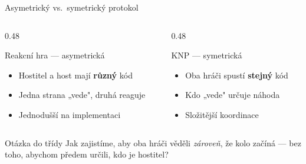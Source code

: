 \begin{frame}{Asymetrický vs.\ symetrický protokol}

  \begin{columns}[T]
    \begin{column}{0.48\textwidth}
      \begin{block}{Reakcní hra — asymetrická}
        \begin{itemize}
          \item Hostitel a host mají \textbf{různý} kód
          \item Jedna strana „vede", druhá reaguje
          \item Jednodušší na implementaci
        \end{itemize}
      \end{block}
    \end{column}
    \begin{column}{0.48\textwidth}
      \begin{block}{KNP — symetrická}
        \begin{itemize}
          \item Oba hráči spustí \textbf{stejný} kód
          \item Kdo „vede" určuje náhoda
          \item Složitější koordinace
        \end{itemize}
      \end{block}
    \end{column}
  \end{columns}

  \bigskip
  \begin{exampleblock}{Otázka do třídy}
    Jak zajistíme, aby oba hráči věděli \emph{zároveň}, že kolo začíná —
    bez toho, abychom předem určili, kdo je hostitel?
  \end{exampleblock}

\end{frame}

